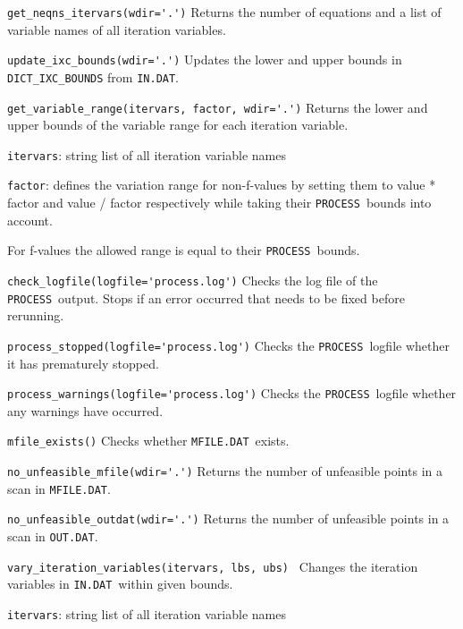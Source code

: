 \documentclass[11pt,a4paper]{report}
\newcommand{\indat}{\mbox{\texttt{IN.DAT}}}
\newcommand{\mfile}{\mbox{\texttt{MFILE.DAT}}}
\newcommand{\outdat}{\mbox{\texttt{OUT.DAT}}}
\newcommand{\process}{\mbox{\texttt{PROCESS}}}
\begin{document}
\begin{description}

\item{\verb|get_neqns_itervars(wdir='.')| } Returns the number of equations
  and a list of variable names of all iteration variables.

\item{\verb|update_ixc_bounds(wdir='.')|} Updates the lower and upper bounds
  in \verb|DICT_IXC_BOUNDS| from \indat.

\item{\verb|get_variable_range(itervars, factor, wdir='.')|} Returns the lower
  and upper bounds of the variable range for each iteration variable.

  \texttt{itervars}: string list of all iteration variable names

  \texttt{factor}: defines the variation range for non-f-values by setting
  them to value * factor and value / factor respectively while taking their
  \process\ bounds into account.

  For f-values the allowed range is equal to their \process\ bounds.

\item{\verb|check_logfile(logfile='process.log')|} Checks the log file of the
  \process\ output.  Stops if an error occurred that needs to be fixed before
  rerunning.

\item{\verb|process_stopped(logfile='process.log')|} Checks the \process\
  logfile whether it has prematurely stopped.

\item{\verb|process_warnings(logfile='process.log')|} Checks the \process\
  logfile whether any warnings have occurred.

\item{\verb|mfile_exists()|} Checks whether \mfile\ exists.

\item{\verb|no_unfeasible_mfile(wdir='.')|} Returns the number of unfeasible
  points in a scan in \mfile.

\item{\verb|no_unfeasible_outdat(wdir='.')|} Returns the number of unfeasible
  points in a scan in \outdat.

\item{\verb|vary_iteration_variables(itervars, lbs, ubs) |} Changes the
  iteration variables in \indat\ within given bounds.

  \texttt{itervars}: string list of all iteration variable names


\end{description}
\end{document}
